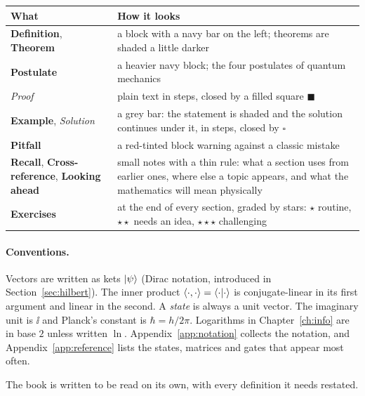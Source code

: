 \begin{center}
\small
\begin{tabular}{@{}>{\raggedright\arraybackslash}p{}>{\raggedright\arraybackslash}p{}@{}}
  \toprule
  What & How it looks\\
  \midrule
  \textbf{\sffamily\color{navy}Definition}, \textbf{\sffamily\color{navy}Theorem} & a block with a navy bar on the left; theorems are shaded a little darker\\
  \textbf{\sffamily\color{navy}Postulate} & a heavier navy block; the four postulates of quantum mechanics\\
  \textit{Proof} & plain text in steps, closed by a filled square $\blacksquare$\\
  \textbf{\sffamily\color{ink}Example}, \textit{Solution} & a grey bar: the statement is shaded and the solution continues under it, in steps, closed by $\square$\\
  \textbf{\sffamily\color{warncol}Pitfall} & a red-tinted block warning against a classic mistake\\
  \textbf{\sffamily\color{navy}Recall}, \textbf{\sffamily\color{navy}Cross-reference}, \textbf{\sffamily\color{navy}Looking ahead} & small notes with a thin rule: what a section uses from earlier ones, where else a topic appears, and what the mathematics will mean physically\\
  \textbf{Exercises} & at the end of every section, graded by stars: $\star$ routine, $\star\star$ needs an idea, $\star\star\star$ challenging\\
  \bottomrule
\end{tabular}
\end{center}

\paragraph{Conventions.}
Vectors are written as kets $\left|\psi\right\rangle$ (Dirac notation, introduced in Section~\ref{sec:hilbert}). The inner product $\langle\cdot,\cdot\rangle=\left\langle\cdot\middle|\cdot\right\rangle$ is conjugate-linear in its first argument and linear in the second. A \emph{state} is always a unit vector. The imaginary unit is $\ii$ and Planck's constant is $\hbar=h/2\pi$. Logarithms in Chapter~\ref{ch:info} are in base $2$ unless written $\ln$.
Appendix~\ref{app:notation} collects the notation, and Appendix~\ref{app:reference} lists the states, matrices and gates that appear most often.

The book is written to be read on its own, with every definition it needs restated.
